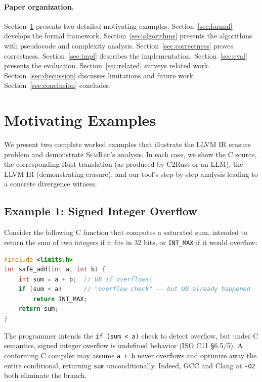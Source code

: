 \documentclass[11pt]{article}
\begin{document}
\paragraph{Paper organization.}
Section~\ref{sec:motivating} presents two detailed motivating examples.
Section~\ref{sec:formal} develops the formal framework.
Section~\ref{sec:algorithms} presents the algorithms with pseudocode and complexity analysis.
Section~\ref{sec:correctness} proves correctness.
Section~\ref{sec:impl} describes the implementation.
Section~\ref{sec:eval} presents the evaluation.
Section~\ref{sec:related} surveys related work.
Section~\ref{sec:discussion} discusses limitations and future work.
Section~\ref{sec:conclusion} concludes.


\section{Motivating Examples}
\label{sec:motivating}

We present two complete worked examples that illustrate the LLVM IR erasure problem and demonstrate \textsc{SemRec}'s analysis.
In each case, we show the C source, the corresponding Rust translation (as produced by C2Rust or an LLM), the LLVM IR (demonstrating erasure), and our tool's step-by-step analysis leading to a concrete divergence witness.

\subsection{Example 1: Signed Integer Overflow}
\label{sec:example-overflow}

Consider the following C function that computes a saturated sum, intended to return the sum of two integers if it fits in 32 bits, or \texttt{INT\_MAX} if it would overflow:

\begin{lstlisting}[language=C, caption={C source: \texttt{safe\_add}}, label={lst:c-safe-add}]
#include <limits.h>
int safe_add(int a, int b) {
    int sum = a + b;  // UB if overflows!
    if (sum < a)      // "overflow check" -- but UB already happened
        return INT_MAX;
    return sum;
}
\end{lstlisting}

The programmer intends the \texttt{if (sum < a)} check to detect overflow, but under C semantics, signed integer overflow is undefined behavior (ISO C11 \S6.5/5).
A conforming C compiler may assume \texttt{a + b} never overflows and optimize away the entire conditional, returning \texttt{sum} unconditionally.
Indeed, GCC and Clang at \texttt{-O2} both eliminate the branch.
\end{document}
